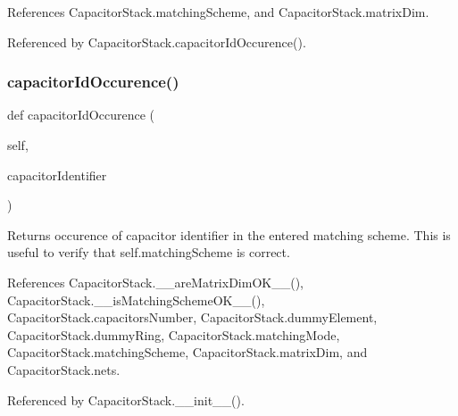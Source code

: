 References Capacitor\+Stack.\+matching\+Scheme, and Capacitor\+Stack.\+matrix\+Dim.



Referenced by Capacitor\+Stack.\+capacitor\+Id\+Occurence().

\mbox{\label{classpython_1_1capacitormatrix_1_1CapacitorStack_a3a76b3e916ad8bfec0513765c297f4ed}} 
\subsubsection{\texorpdfstring{capacitor\+Id\+Occurence()}{capacitorIdOccurence()}}
{\footnotesize\ttfamily def capacitor\+Id\+Occurence (\begin{DoxyParamCaption}\item[{}]{self,  }\item[{}]{capacitor\+Identifier }\end{DoxyParamCaption})}

\begin{DoxyReturn}{Returns}
occurence of capacitor identifier in the entered matching scheme. This is useful to verify that {\ttfamily self.\+matching\+Scheme} is correct. 
\end{DoxyReturn}


References Capacitor\+Stack.\+\_\+\+\_\+are\+Matrix\+Dim\+O\+K\+\_\+\+\_\+(), Capacitor\+Stack.\+\_\+\+\_\+is\+Matching\+Scheme\+O\+K\+\_\+\+\_\+(), Capacitor\+Stack.\+capacitors\+Number, Capacitor\+Stack.\+dummy\+Element, Capacitor\+Stack.\+dummy\+Ring, Capacitor\+Stack.\+matching\+Mode, Capacitor\+Stack.\+matching\+Scheme, Capacitor\+Stack.\+matrix\+Dim, and Capacitor\+Stack.\+nets.



Referenced by Capacitor\+Stack.\+\_\+\+\_\+init\+\_\+\+\_\+().

\mbox{\label{classpython_1_1capacitormatrix_1_1CapacitorStack_a142799d140cb1936225cf8e224af2b8d}} 
